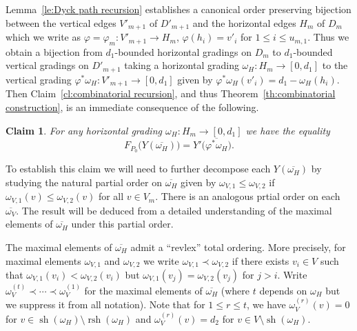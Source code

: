 \documentclass{amsart}
\newtheorem{claim}[theorem]{Claim}
\newcommand{\rsh}{\operatorname{rsh}}
\newcommand{\sh}{\operatorname{sh}}
\begin{document}
Lemma~\ref{le:Dyck path recursion} establishes a canonical order preserving bijection between the vertical edges $V'_{m+1}$ of $D'_{m+1}$ and the horizontal edges $H_m$ of $D_m$ which we write as $\varphi=\varphi_m:V'_{m+1}\to H_m$, $\varphi(h_i)=v'_i$ for $1\le i\le u_{m,1}$.  Thus we obtain a bijection from $d_1$-bounded horizontal gradings on $D_m$ to $d_1$-bounded vertical gradings on $D'_{m+1}$ taking a horizontal grading $\omega_H:H_m\to[0,d_1]$ to the vertical grading $\varphi^*\omega_H:V'_{m+1}\to[0,d_1]$ given by $\varphi^*\omega_H(v'_i)=d_1-\omega_H(h_i)$.  Then Claim~\ref{cl:combinatorial recursion}, and thus Theorem~\ref{th:combinatorial construction}, is an immediate consequence of the following.
\begin{claim}\label{cl:horizontal to vertical}
  For any horizontal grading $\omega_H:H_m\to[0,d_1]$ we have the equality
  \begin{equation}\label{eq:horizontal to vertical}
    F_{P_0}\big(Y(\overline{\omega_H})\big)=Y'\big(\overline{\varphi^*\omega_H}\big).
  \end{equation}
\end{claim}
To establish this claim we will need to further decompose each $Y(\overline{\omega_H})$ by studying the natural partial order on $\overline{\omega_H}$ given by $\omega_{V,1}\le\omega_{V,2}$ if $\omega_{V,1}(v)\le\omega_{V,2}(v)$ for all $v\in V_m$.  There is an analogous prtial order on each $\overline{\omega_V}$.  The result will be deduced from a detailed understanding of the maximal elements of $\overline{\omega_H}$ under this partial order.  

The maximal elements of $\overline{\omega_H}$ admit a ``revlex'' total ordering.  More precisely, for maximal elements $\omega_{V,1}$ and $\omega_{V,2}$ we write $\omega_{V,1}\prec\omega_{V,2}$ if there exists $v_i\in V$ such that $\omega_{V,1}(v_i)<\omega_{V,2}(v_i)$ but $\omega_{V,1}(v_j)=\omega_{V,2}(v_j)$ for $j>i$.  Write $\omega_V^{(t)}\prec\cdots\prec\omega_V^{(1)}$ for the maximal elements of $\overline{\omega_H}$ (where $t$ depends on $\omega_H$ but we suppress it from all notation).  Note that for $1\le r\le t$, we have $\omega_V^{(r)}(v)=0$ for $v\in\sh(\omega_H)\setminus\rsh(\omega_H)$ and $\omega_V^{(r)}(v)=d_2$ for $v\in V\setminus\sh(\omega_H)$.  
\end{document}
